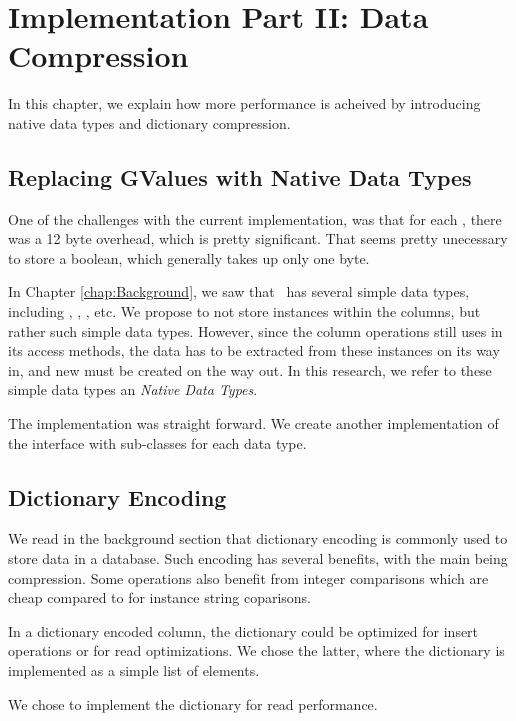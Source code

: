 \chapter{Implementation Part II: Data Compression}
\label{chap:Implementation Part II: Data Compression}
In this chapter, we explain how more performance is acheived by introducing native data types and dictionary compression.

\section{Replacing GValues with Native Data Types}
\label{sec:Replacing GValues with Native Data Types}
One of the challenges with the current implementation, was that for each , there was a 12 byte overhead, which is pretty significant. That seems pretty unecessary to store a boolean, which generally takes up only one byte. 

In Chapter \ref{chap:Background}, we saw that \delphi~has several simple data types, including , , , etc. We propose to not store  instances within the columns, but rather such simple data types. However, since the column operations still uses  in its access methods, the data has to be extracted from these instances on its way in, and new  must be created on the way out. In this research, we refer to these simple data types an \textit{Native Data Types}.

The implementation was straight forward. We create another implementation of the  interface with sub-classes for each data type. 

\section{Dictionary Encoding}
\label{sec:Dictionary Encoding}
We read in the background section that dictionary encoding is commonly used to store data in a database. Such encoding has several benefits, with the main being compression. Some operations also benefit from integer comparisons which are cheap compared to for instance string coparisons.

In a dictionary encoded column, the dictionary could be optimized for insert operations or for read optimizations. We chose the latter, where the dictionary is implemented as a simple list of elements.


We chose to implement the dictionary for read performance.


